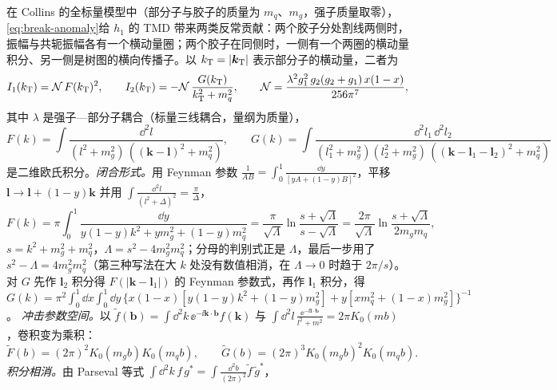 \begin{example}\label{ex:break-c07}
在 Collins 的全标量模型中（部分子与胶子的质量为 $m_q$、$m_g$，强子质量取零），\cref{eq:break-anomaly}给 $h_1$ 的 TMD 带来两类反常贡献：两个胶子分处割线两侧时，振幅与共轭振幅各有一个横动量圈；两个胶子在同侧时，一侧有一个两圈的横动量积分、另一侧是树图的横向传播子。以 $k_{\mathrm{T}}=|\boldsymbol k_{\mathrm T}|$ 表示部分子的横动量，二者为\cite[式~(10)(11)]{Collins2007}
\begin{equation}\label{eq:break-I12}
I_1(k_{\mathrm{T}})=\mathcal N\,F(k_{\mathrm{T}})^2,\qquad I_2(k_{\mathrm{T}})=-\mathcal N\,\frac{G(k_{\mathrm{T}})}{k_{\mathrm{T}}^2+m_q^2},\qquad \mathcal N=\frac{\lambda^2g_1^2\,g_2(g_2+g_1)\,x(1-x)}{256\pi^7},
\end{equation}
其中 $\lambda$ 是强子—部分子耦合（标量三线耦合，量纲为质量），
\begin{equation}\label{eq:break-FG}
F(k)=\int\frac{\dd^2l}{(l^2+m_g^2)\,((\boldsymbol k-\boldsymbol l)^2+m_q^2)},\qquad
G(k)=\int\frac{\dd^2l_1\,\dd^2l_2}{(l_1^2+m_g^2)(l_2^2+m_g^2)\,((\boldsymbol k-\boldsymbol l_1-\boldsymbol l_2)^2+m_q^2)}
\end{equation}
是二维欧氏积分。\emph{闭合形式。}用 Feynman 参数 $\frac1{AB}=\int_0^1\frac{\dd y}{[yA+(1-y)B]^2}$，平移 $\boldsymbol l\to\boldsymbol l+(1-y)\boldsymbol k$ 并用 $\int\frac{\dd^2l}{(l^2+\Delta)^2}=\frac\pi\Delta$，
\begin{equation}\label{eq:break-F-closed}
F(k)=\pi\int_0^1\frac{\dd y}{y(1-y)k^2+ym_g^2+(1-y)m_q^2}=\frac{\pi}{\sqrt\Lambda}\ln\frac{s+\sqrt\Lambda}{s-\sqrt\Lambda}=\frac{2\pi}{\sqrt\Lambda}\ln\frac{s+\sqrt\Lambda}{2m_gm_q},
\end{equation}
$s=k^2+m_g^2+m_q^2$，$\Lambda=s^2-4m_g^2m_q^2$；分母的判别式正是 $\Lambda$，最后一步用了 $s^2-\Lambda=4m_g^2m_q^2$（第三种写法在大 $k$ 处没有数值相消，在 $\Lambda\to0$ 时趋于 $2\pi/s$）。对 $G$ 先作 $\boldsymbol l_2$ 积分得 $F(|\boldsymbol k-\boldsymbol l_1|)$ 的 Feynman 参数式，再作 $\boldsymbol l_1$ 积分，得
$G(k)=\pi^2\int_0^1\dd x\int_0^1\dd y\,\big\{x(1-x)[y(1-y)k^2+(1-y)m_g^2]+y[xm_q^2+(1-x)m_g^2]\big\}^{-1}$。
\emph{冲击参数空间。}以 $\tilde f(\boldsymbol b)=\int\dd^2k\,\ee^{-\ii\boldsymbol k\cdot\boldsymbol b}f(\boldsymbol k)$ 与 $\int\dd^2l\,\frac{\ee^{-\ii\boldsymbol l\cdot\boldsymbol b}}{l^2+m^2}=2\pi K_0(mb)$，卷积变为乘积：
\begin{equation}\label{eq:break-FG-b}
\tilde F(b)=(2\pi)^2K_0(m_gb)K_0(m_qb),\qquad \tilde G(b)=(2\pi)^3K_0(m_gb)^2K_0(m_qb).
\end{equation}
\emph{积分相消。}由 Parseval 等式 $\int\dd^2k\,f\,g^*=\int\frac{\dd^2b}{(2\pi)^2}\tilde f\,\tilde g^*$，

\end{example}
